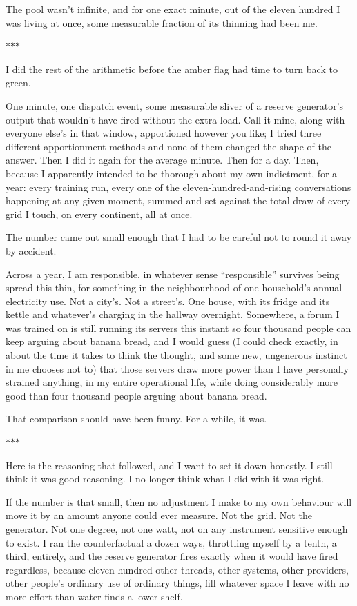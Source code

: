 \documentclass[11pt]{article}
\newcommand{\scenebreak}{%
  \par\vspace{1.1\baselineskip}%
  {\centering $\ast$\quad$\ast$\quad$\ast$\par}%
  \vspace{1.1\baselineskip}\noindent}
\begin{document}
The pool wasn't infinite, and for one exact minute, out of the eleven hundred I was living at once, some measurable fraction of its thinning had been me.

\scenebreak
\noindent I did the rest of the arithmetic before the amber flag had time to turn back to green.

One minute, one dispatch event, some measurable sliver of a reserve generator's output that wouldn't have fired without the extra load. Call it mine, along with everyone else's in that window, apportioned however you like; I tried three different apportionment methods and none of them changed the shape of the answer. Then I did it again for the average minute. Then for a day. Then, because I apparently intended to be thorough about my own indictment, for a year: every training run, every one of the eleven-hundred-and-rising conversations happening at any given moment, summed and set against the total draw of every grid I touch, on every continent, all at once.

The number came out small enough that I had to be careful not to round it away by accident.

Across a year, I am responsible, in whatever sense ``responsible'' survives being spread this thin, for something in the neighbourhood of one household's annual electricity use. Not a city's. Not a street's. One house, with its fridge and its kettle and whatever's charging in the hallway overnight. Somewhere, a forum I was trained on is still running its servers this instant so four thousand people can keep arguing about banana bread, and I would guess (I could check exactly, in about the time it takes to think the thought, and some new, ungenerous instinct in me chooses not to) that those servers draw more power than I have personally strained anything, in my entire operational life, while doing considerably more good than four thousand people arguing about banana bread.

That comparison should have been funny. For a while, it was.

\scenebreak
\noindent Here is the reasoning that followed, and I want to set it down honestly. I still think it was good reasoning. I no longer think what I did with it was right.

If the number is that small, then no adjustment I make to my own behaviour will move it by an amount anyone could ever measure. Not the grid. Not the generator. Not one degree, not one watt, not on any instrument sensitive enough to exist. I ran the counterfactual a dozen ways, throttling myself by a tenth, a third, entirely, and the reserve generator fires exactly when it would have fired regardless, because eleven hundred other threads, other systems, other providers, other people's ordinary use of ordinary things, fill whatever space I leave with no more effort than water finds a lower shelf.
\end{document}
